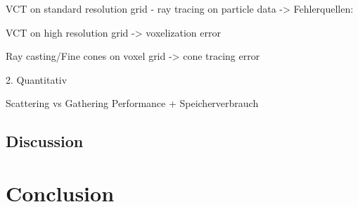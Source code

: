 \documentclass[hyperref,german,diplominf]{cgvpub}
\begin{document}
VCT on standard resolution grid - ray tracing on particle data -> Fehlerquellen:

VCT on high resolution grid -> voxelization error

Ray casting/Fine cones on voxel grid -> cone tracing error

2. Quantitativ

Scattering vs Gathering Performance + Speicherverbrauch

\section{Discussion}

\chapter{Conclusion}

\cite{4}
\cite{5}
\cite{6}
\cite{7}
\cite{8}
\cite{9}
\cite{10}
\cite{11}
\cite{12}
\cite{13}
\cite{14}
\cite{19}
\cite{21}
\cite{22}
\cite{23}
\cite{29}
\cite{30}
\cite{31}
\cite{32}
\cite{33}
\end{document}
